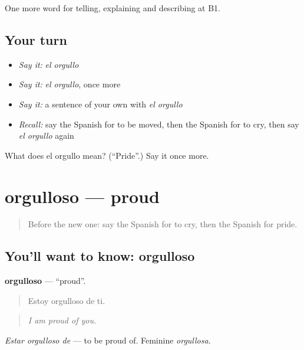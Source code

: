 \begin{grammarlens}[title={What you've built}]
One more word for telling, explaining and describing at B1.
\end{grammarlens}

\subsection*{Your turn}
\begin{itemize}
\raggedright
  \item \emph{Say it:} \emph{el orgullo}
  \item \emph{Say it:} \emph{el orgullo}, once more
  \item \emph{Say it:} a sentence of your own with \emph{el orgullo}
  \item \emph{Recall:} say the Spanish for to be moved, then the Spanish for to cry, then say \emph{el orgullo} again
\end{itemize}

\begin{tcolorbox}[breakable,colback=teal!4,colframe=teal!35!black,title={Before you move on}]
What does el orgullo mean? (\textquotedblleft{}Pride\textquotedblright{}.) Say it once more.
\end{tcolorbox}
\section[orgulloso]{orgulloso — proud}

\label{lesson:ES-C705-orgulloso}



\begin{quote}
Before the new one: say the Spanish for to cry, then the Spanish for pride.
\end{quote}

\subsection*{You'll want to know: orgulloso}
\textbf{orgulloso} — \textquotedblleft{}proud\textquotedblright{}.

\begin{quote}
Estoy orgulloso de ti.
\end{quote}

\begin{quote}
\emph{I am proud of you.}
\end{quote}

\emph{Estar orgulloso de} — to be proud of. Feminine \emph{orgullosa}.

